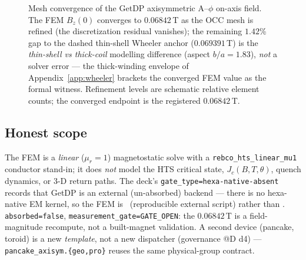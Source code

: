 \begin{figure}[h]
\centering
{}
\caption{Mesh convergence of the GetDP axisymmetric A--$\phi$ on-axis
field. The FEM $B_z(0)$ converges to $0.06842$\,T as the OCC mesh is
refined (the discretization residual vanishes); the remaining $1.42$\% gap
to the dashed thin-shell Wheeler anchor ($0.069391$\,T) is the
\emph{thin-shell vs thick-coil} modelling difference (aspect
$b/a\!=\!1.83$), \emph{not} a solver error --- the thick-winding envelope
of Appendix~\ref{app:wheeler} brackets the converged FEM value as the
formal witness. Refinement levels are schematic relative element counts;
the converged endpoint is the registered $0.06842$\,T.}
\label{fig:mesh-conv}
\end{figure}

\subsection{Honest scope}
\label{app:getdp-honest}

The FEM is a \emph{linear} ($\mu_r\!=\!1$) magnetostatic solve with a
\texttt{rebco\_hts\_linear\_mu1} conductor stand-in; it does \emph{not}
model the HTS critical state, $J_c(B,T,\theta)$, quench dynamics, or 3-D
return paths. The deck's \texttt{gate\_type=hexa-native-absent} records
that GetDP is an external (un-absorbed) backend --- there is no
hexa-native EM kernel, so the FEM is \tierGreen\ (reproducible external
script) rather than \tierBlue. \texttt{absorbed=false},
\texttt{measurement\_gate=GATE\_OPEN}: the $0.06842$\,T is a field-magnitude
recompute, not a built-magnet validation. A second device (pancake,
toroid) is a new \emph{template}, not a new dispatcher (governance @D d4) ---
\texttt{pancake\_axisym.\{geo,pro\}} reuses the same physical-group
contract.
